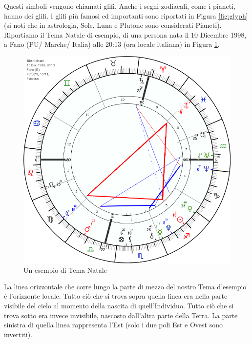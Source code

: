 Questi simboli vengono chiamati glifi. Anche i segni zodiacali, come i pianeti, hanno dei glifi. I glifi più famosi ed importanti sono riportati in Figura \ref{fig:glyph} (si noti che in astrologia, Sole, Luna e Plutone sono considerati Pianeti).\newline
Riportiamo il Tema Natale di esempio, di una persona nata il 10 Dicembre 1998, a Fano (PU/ Marche/ Italia) alle 20:13 (ora locale italiana) in Figura \ref{fig:natal}.\newline
\begin{figure}[H]
\includegraphics[width=\textwidth,height=\textheight,keepaspectratio]{img/natal.png}
\caption{Un esempio di Tema Natale}
\label{fig:natal}

\end{figure}
La linea orizzontale che corre lungo la parte di mezzo del nostro Tema d'esempio è l'orizzonte locale.\newline
Tutto ciò che si trova sopra quella linea era nella parte visibile del cielo al momento della nascita di quell'Individuo.\newline
Tutto ciò che si trova sotto era invece invisibile, nascosto dall'altra parte della Terra.\newline
La parte sinistra di quella linea rappresenta l'Est (solo i due poli Est e Ovest sono invertiti).\newline
